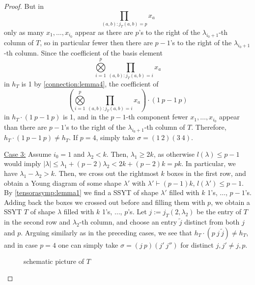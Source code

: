\documentclass[a4paper]{amsart}
\newcommand{\abs}[1]{\left| #1\right|}
\begin{document}
\begin{proof}
	But in
	\begin{displaymath}
		\prod\limits_{(a,b):j_T(a,b)=p}x_a
	\end{displaymath}
	only as many $x_{1},\ldots,x_{i_0}$ appear as there are $p$'s to the right of the $\lambda_{i_0+1}$-th column of $T$,
	so in particular fewer then there are $p-1$'s to the right of the $\lambda_{i_0+1}$-th column.
	Since the coefficient of the basis element
	\begin{displaymath}
		\bigotimes\limits_{i=1}^p\prod\limits_{(a,b):j_T(a,b)=i}x_{a}
	\end{displaymath}
	in $h_T$ is 1 by \cref{connection:lemma4},
	the coefficient of
	\begin{displaymath}
		\left(\bigotimes\limits_{i=1}^p\prod\limits_{(a,b):j_T(a,b)=i}x_{a}\right)\cdot (1\ p-1\ p)
	\end{displaymath}
	in $h_T\cdot (1\ p-1\ p)$  is 1,
	and in the $p-1$-th component fewer $x_1,\ldots,x_{i_0}$ appear than there are $p-1$'s to the right of the $\lambda_{i_0+1}$-th column of $T$.
	Therefore, $h_T\cdot (1\ p-1\ p)\neq h_T$.
	If $p=4$, simply take $\sigma=(1\ 2)(3\ 4)$.
	
	\underline{Case 3:} Assume $i_0=1$ and $\lambda_2<k$.
	Then, $\lambda_1\geq 2k$,
	as otherwise $l(\lambda)\leq p-1$ would imply $\abs{\lambda}\leq\lambda_1+(p-2)\lambda_2< 2k+(p-2)k=pk$.
	In particular, we have $\lambda_1-\lambda_2>k$.
	Then, we cross out the rightmost $k$ boxes in the first row,
	and obtain a Young diagram of some shape $\lambda'$ with $\lambda'\vdash (p-1)k$, $l(\lambda')\leq p-1$.
	By \cref{tensorasymp:lemma1} we find a SSYT of shape $\lambda'$ filled with $k$ 1's, $\ldots$, $p-1$'s.
	Adding back the boxes we crossed out before and filling them with $p$, we obtain a SSYT $T$ of shape $\lambda$ filled with $k$ 1's, $\ldots$, $p$'s.
	Let $j:=j_T(2,\lambda_2)$ be the entry of $T$ in the second row and $\lambda_{2}$-th column,
	and choose an entry $\tilde j$ distinct from both $j$ and $p$.
	Arguing similarly as in the preceding cases,
	we see that $h_T\cdot(p\ j\ \tilde j)\neq h_T$, and in case $p=4$ one can simply take $\sigma=(j\ p)(j'\ j'')$ for distinct $j,j'\neq j,p$.
	\begin{figure}[H]
		\centering
		\caption*{schematic picture of $T$}
	\end{figure}
	

\end{proof}
\end{document}
